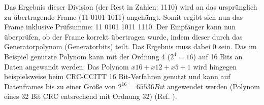 Das Ergebnis dieser Division (der Rest in Zahlen: 1110) wird an das
urspr{\"u}nglich zu {\"u}bertragende Frame (11 0101 1011) angeh{\"a}ngt. Somit ergibt sich
nun das Frame inklusive Pr{\"u}fsumme: 11 0101 1011 1110. Der
Empf{\"a}nger kann nun {\"u}berpr{\"u}fen, ob der Frame korrekt {\"u}bertragen
wurde, indem dieser durch das Generatorpolynom (Generatorbits) teilt. Das
Ergebnis muss dabei 0 sein. Das im Beispiel genutzte Polynom kann mit der Ordnung 4
($2^4=16$) auf 16 Bits an Daten angewandt werden. Das Polynom $x16+x12+x5+1$
wird hingegen beispielsweise beim CRC-CCITT 16 Bit-Verfahren genutzt und
kann auf Datenframes bis zu einer Gr{\"o}{\ss}e von $2^{16}=65536 Bit$
angewendet werden (Polynom eines 32 Bit CRC entsrechend mit Ordnung 32) (Ref. \cite{web2}).

